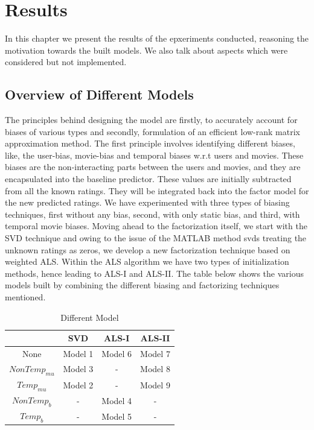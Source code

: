 \chapter{Results}


\textsf{In this chapter we present the results of the epxeriments conducted,
reasoning the motivation towards the built models. We also talk about aspects
which were considered but not implemented.}

\section{Overview of Different Models}
The principles behind designing the model are firstly, to accurately account for
biases of various types and secondly, formulation of an efficient low-rank
matrix approximation method. The first principle involves identifying different
biases, like, the user-bias, movie-bias and temporal biases w.r.t users and
movies. These biases are the non-interacting parts between the users and movies,
and they are encapsulated into the baseline predictor. These values are
initially subtracted from all the known ratings. They will be integrated back
into the factor model for the new predicted ratings. We have experimented with
three types of biasing techniques, first without any bias, second, with only
static bias, and third, with temporal movie biases. Moving ahead to the
factorization itself, we start with the SVD technique and owing to the
issue of the MATLAB method svds treating the unknown ratings as zeros, we
develop a new factorization technique based on
weighted ALS. Within the ALS algorithm we have two types of initialization
methods, hence leading to ALS-I and ALS-II. The table below shows the various
models built by combining the different biasing and factorizing techniques
mentioned.


\begin{table}
\begin{center}
 
     \begin{tabular}{|c|c|c|c|}
       \hline
        & SVD & ALS-I & ALS-II \\ \hline
       None & Model 1 & Model 6 & Model 7\\        
       $NonTemp_{mu}$ & Model 3 & - & Model 8\\
       $Temp_{mu}$ & Model 2 & - & Model 9\\
       $NonTemp_b$ & - & Model 4 & -\\
       $Temp_b$ & - & Model 5 & -\\ \hline
    \end{tabular}
    \caption{Different Model}     
\end{center}
\end{table}

